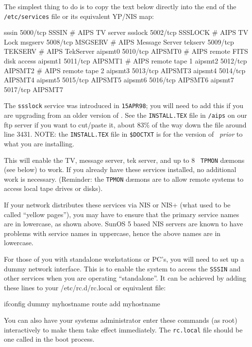 The simplest thing to do is to copy the text below directly into the end
of the {\tt /etc/services} file or its equivalent YP/NIS map: \medskip

\fortran
sssin           5000/tcp        SSSIN      # AIPS TV server
ssslock         5002/tcp        SSSLOCK    # AIPS TV Lock
msgserv         5008/tcp        MSGSERV    # AIPS Message Server
tekserv         5009/tcp        TEKSERV    # AIPS TekServer
aipsmt0         5010/tcp        AIPSMT0    # AIPS remote FITS disk access
aipsmt1         5011/tcp        AIPSMT1    # AIPS remote tape 1
aipsmt2         5012/tcp        AIPSMT2    # AIPS remote tape 2
aipsmt3         5013/tcp        AIPSMT3
aipsmt4         5014/tcp        AIPSMT4
aipsmt5         5015/tcp        AIPSMT5
aipsmt6         5016/tcp        AIPSMT6
aipsmt7         5017/tcp        AIPSMT7
\endfortran\medskip

\noindent The {\tt ssslock} service was introduced in {\tt 15APR98}; you
will need to add this if you are upgrading from an older version of
\AIPS.  See the {\tt INSTALL.TEX} file in {\tt /aips} on our ftp server
if you want to cut/paste it, about 83\% of the way down the file
around line 3431.  NOTE: the {\tt INSTALL.TEX} file in {\tt\$DOCTXT}
is for the version of \AIPS\ {\it prior\/} to what you are installing.

This will enable the TV, message server, tek server, and up to 8 {\tt
TPMON} d\ae mons (see below) to work.  If you already have these
services installed, no additional work is necessary.  (Reminder: the
{\tt TPMON} d\ae mons are to allow remote systems to access local tape
drives or disks).

If your network distributes these services via NIS or NIS+ (what used to
be called ``yellow pages''), you may have to ensure that the primary
service names are in lowercase, as shown above.  SunOS 5 based NIS
servers are known to have problems with service names in uppercase,
hence the above names are in lowercase.

For those of you with standalone workstations or PC's, you will need to
set up a dummy network interface.  This is to enable the system to
access the {\tt SSSIN} and other services when you are operating
``standalone''.  It can be achieved by adding these lines to your
{/etc/rc.d/rc.local} or equivalent file:\medskip

\fortran
ifconfig dummy myhostname
route add myhostname
\endfortran\medskip

\noindent You can also have your systems administrator enter these
commands (as root) interactively to make them take effect immediately.
The {\tt rc.local} file should be one called in the boot process.

